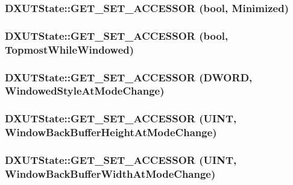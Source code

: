 \label{class_d_x_u_t_state_a500e3875a183dcaa6c0cb0a2cdc74cc1}
\hypertarget{class_d_x_u_t_state_ac4601af8960b515e304bc4f0bb28dbe6}{
\subsubsection[{GET\_\-SET\_\-ACCESSOR}]{\setlength{\rightskip}{0pt plus 5cm}DXUTState::GET\_\-SET\_\-ACCESSOR (bool, \/  Minimized)}}
\label{class_d_x_u_t_state_ac4601af8960b515e304bc4f0bb28dbe6}
\hypertarget{class_d_x_u_t_state_ad26450006ff4e314b24aca74ea91bb26}{
\subsubsection[{GET\_\-SET\_\-ACCESSOR}]{\setlength{\rightskip}{0pt plus 5cm}DXUTState::GET\_\-SET\_\-ACCESSOR (bool, \/  TopmostWhileWindowed)}}
\label{class_d_x_u_t_state_ad26450006ff4e314b24aca74ea91bb26}
\hypertarget{class_d_x_u_t_state_a5b16a6c1961ef412cff6e67cdb6018e5}{
\subsubsection[{GET\_\-SET\_\-ACCESSOR}]{\setlength{\rightskip}{0pt plus 5cm}DXUTState::GET\_\-SET\_\-ACCESSOR (DWORD, \/  WindowedStyleAtModeChange)}}
\label{class_d_x_u_t_state_a5b16a6c1961ef412cff6e67cdb6018e5}
\hypertarget{class_d_x_u_t_state_aa376410a98f1d763d13ab8cf678ca4e3}{
\subsubsection[{GET\_\-SET\_\-ACCESSOR}]{\setlength{\rightskip}{0pt plus 5cm}DXUTState::GET\_\-SET\_\-ACCESSOR (UINT, \/  WindowBackBufferHeightAtModeChange)}}
\label{class_d_x_u_t_state_aa376410a98f1d763d13ab8cf678ca4e3}
\hypertarget{class_d_x_u_t_state_aa9b801ff918be9e94b0c1b0c495d9988}{
\subsubsection[{GET\_\-SET\_\-ACCESSOR}]{\setlength{\rightskip}{0pt plus 5cm}DXUTState::GET\_\-SET\_\-ACCESSOR (UINT, \/  WindowBackBufferWidthAtModeChange)}}
